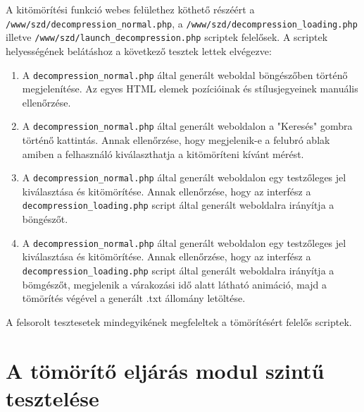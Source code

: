 \documentclass[oneside,titlepage,12pt,a4paper]{report}
\begin{document}
A kitömörítési funkció webes felülethez köthető részéért a \texttt{/www/szd/decompression\_normal.php}, a \texttt{/www/szd/decompression\_loading.php} illetve \texttt{/www/szd/launch\_decompression.php} scriptek felelősek. A scriptek helyességének belátáshoz a következő tesztek lettek elvégezve:

\begin{enumerate}
\item A \texttt{decompression\_normal.php} által generált weboldal böngészőben történő megjelenítése. Az egyes HTML elemek pozícióinak és stílusjegyeinek manuális ellenőrzése.
\item A \texttt{decompression\_normal.php} által generált weboldalon a "Keresés" gombra történő kattintás. Annak ellenőrzése, hogy megjelenik-e a felubró ablak amiben a felhasználó kiválaszthatja a kitömöríteni kívánt mérést.
\item A \texttt{decompression\_normal.php} által generált weboldalon egy testzőleges jel kiválasztása és kitömörítése. Annak ellenőrzése, hogy az interfész a \texttt{decompression\_loading.php} script által generált weboldalra irányítja a böngészőt.

\item A \texttt{decompression\_normal.php} által generált weboldalon egy testzőleges jel kiválasztása és kitömörítése. Annak ellenőrzése, hogy az interfész a \texttt{decompression\_loading.php} script által generált weboldalra irányítja a bömgészőt, megjelenik a várakozási idő alatt látható animáció, majd a tömörítés végével a generált .txt állomány letöltése. 

\end{enumerate}

A felsorolt tesztesetek mindegyikének megfeleltek a tömörítésért felelős scriptek.


\section{A tömörítő eljárás modul szintű tesztelése}
\end{document}
